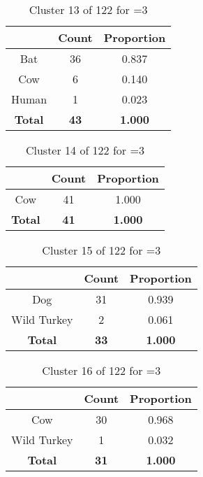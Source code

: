 \begin{table}[ht!]
\centering
\begin{tabular}{|c|c|c|}
\hline
\bf \Spec{} &\bf Count &\bf Proportion\\ \hline \hline
Bat & 36 & 0.837\\ \hline
Cow & 6 & 0.140\\ \hline
Human & 1 & 0.023\\ \hline
\hline
\bf Total & \bf 43 & \bf 1.000\\ \hline
\end{tabular}
\label{tab:cluster:13:3}
\caption{Cluster 13 of 122 for \minneigh{}=3}
\end{table}

\begin{table}[ht!]
\centering
\begin{tabular}{|c|c|c|}
\hline
\bf \Spec{} &\bf Count &\bf Proportion\\ \hline \hline
Cow & 41 & 1.000\\ \hline
\hline
\bf Total & \bf 41 & \bf 1.000\\ \hline
\end{tabular}
\label{tab:cluster:14:3}
\caption{Cluster 14 of 122 for \minneigh{}=3}
\end{table}

\begin{table}[ht!]
\centering
\begin{tabular}{|c|c|c|}
\hline
\bf \Spec{} &\bf Count &\bf Proportion\\ \hline \hline
Dog & 31 & 0.939\\ \hline
Wild Turkey & 2 & 0.061\\ \hline
\hline
\bf Total & \bf 33 & \bf 1.000\\ \hline
\end{tabular}
\label{tab:cluster:15:3}
\caption{Cluster 15 of 122 for \minneigh{}=3}
\end{table}

\begin{table}[ht!]
\centering
\begin{tabular}{|c|c|c|}
\hline
\bf \Spec{} &\bf Count &\bf Proportion\\ \hline \hline
Cow & 30 & 0.968\\ \hline
Wild Turkey & 1 & 0.032\\ \hline
\hline
\bf Total & \bf 31 & \bf 1.000\\ \hline
\end{tabular}
\label{tab:cluster:16:3}
\caption{Cluster 16 of 122 for \minneigh{}=3}
\end{table}

